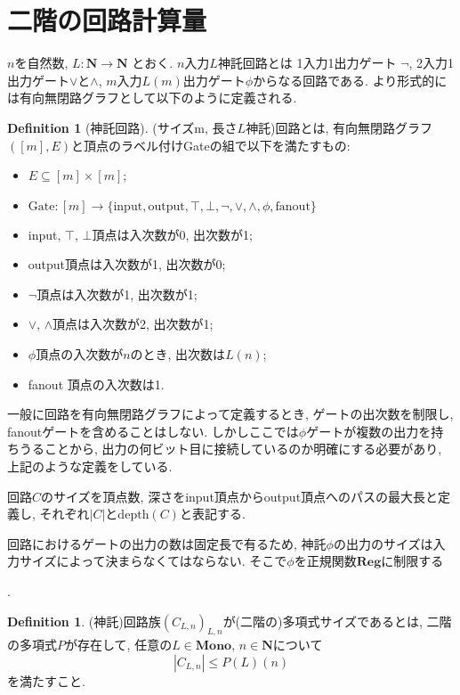 \documentclass[12pt,a4paper]{article}
\theoremstyle{definition}
\newtheorem{definition}[theorem]{Definition}
\theoremstyle{remark}
\newcommand{\N}{\mathbf N}
\newcommand{\funReg}{\mathbf{Reg}}
\begin{document}
\section{二階の回路計算量}
$n$を自然数, $L \colon \N \to \N$ とおく.
$n$入力$L$神託回路とは
1入力1出力ゲート $\neg$, 2入力1出力ゲート$\vee$と$\wedge$, 
$m$入力$L(m)$出力ゲート$\phi$からなる回路である.
より形式的には有向無閉路グラフとして以下のように定義される.

\begin{definition}[神託回路]
(サイズm, 長さ$L$神託)回路とは,
有向無閉路グラフ$([m], E)$と頂点のラベル付けGateの組で以下を満たすもの:
\begin{itemize}
 \item $E \subseteq [m] \times [m]$;
 \item $\mathrm{Gate} \colon [m] \to \{\mathrm{input}, \mathrm{output}, \top, \bot, \neg, \vee, \wedge, \phi, \mathrm{fanout}\}$
 \item input, $\top$, $\bot$頂点は入次数が0, 出次数が1;
 \item output頂点は入次数が1, 出次数が0;
 \item $\neg$頂点は入次数が1, 出次数が1;
 \item $\vee$, $\wedge$頂点は入次数が2, 出次数が1;
 \item $\phi$頂点の入次数が$n$のとき, 出次数は$L(n)$;
 \item fanout 頂点の入次数は1.
\end{itemize}
\end{definition}

一般に回路を有向無閉路グラフによって定義するとき,
ゲートの出次数を制限し, fanoutゲートを含めることはしない.
しかしここでは$\phi$ゲートが複数の出力を持ちうることから,
出力の何ビット目に接続しているのか明確にする必要があり,
上記のような定義をしている.

回路$C$のサイズを頂点数, 深さをinput頂点からoutput頂点へのパスの最大長と定義し,
それぞれ$|C|$と$\mathrm{depth}(C)$と表記する.

回路におけるゲートの出力の数は固定長で有るため, 神託$\phi$の出力のサイズは入力サイズによって決まらなくてはならない. そこで$\phi$を正規関数$\funReg$に制限する

.

\begin{definition}
(神託)回路族$(C_{L,n})_{L,n}$が(二階の)多項式サイズであるとは,
二階の多項式$P$が存在して, 任意の$L \in \mathbf{Mono}$, $n \in \N$について
\[
 |C_{L,n}| \le P(L)(n)
\]
を満たすこと.
\end{definition}
\end{document}

